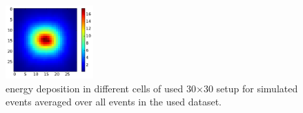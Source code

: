 
\begin{figure}
\begin{center}
\includegraphics[width=0.3\textwidth]{figures/mean_cluster.pdf}
\caption{energy deposition in different cells of used 30$\times $30 setup for \geant simulated events averaged over all events in the used dataset. \label{fig:real-imgs}}
\end{center}
\end{figure}
